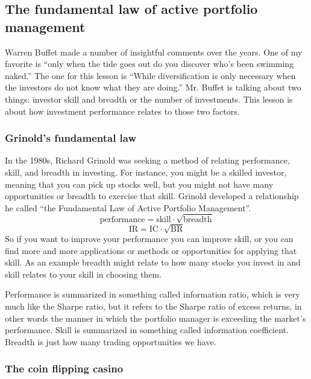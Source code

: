 \documentclass[12pt]{article}
\newcommand{\q}[1]{``#1''}
\begin{document}
\subsection{The fundamental law of active portfolio management}

Warren Buffet made a number of insightful comments over the years. One of my favorite is \q{only when the tide goes out do you discover who's been swimming naked.} The one for this lesson is \q{While diversification is only necessary when the investors do not know what they are doing.} Mr. Buffet is talking about two things: investor skill and breadth or the number of investments. This lesson is about how investment performance relates to those two factors.

\subsubsection{Grinold's fundamental law}

In the 1980s, Richard Grinold was seeking a method of relating performance, skill, and breadth in investing. For instance, you might be a skilled investor, meaning that you can pick up stocks well, but you might not have many opportunities or breadth to exercise that skill. Grinold developed a relationship he called \q{the Fundamental Law of Active Portfolio Management}. 
\begin{equation}
\text{performance} = \text{skill}\cdot\sqrt{\text{breadth}} 
\end{equation}
\begin{equation}
\text{IR} = \text{IC}\cdot\sqrt{\text{BR}}
\end{equation}
So if you want to improve your performance you can improve skill, or you can find more and more applications or methods or opportunities for applying that skill. As an example breadth might relate to how many stocks you invest in and skill relates to your skill in choosing them. 

Performance is summarized in something called information ratio, which is very much like the Sharpe ratio, but it refers to the Sharpe ratio of excess returns, in other words the manner in which the portfolio manager is exceeding the market's performance. Skill is summarized in something called information coefficient. Breadth is just how many trading opportunities we have. 

\subsubsection{The coin flipping casino}
\end{document}
